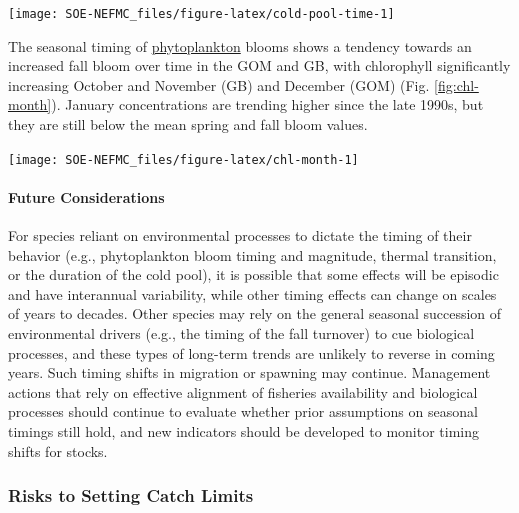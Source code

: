 \documentclass[
  10pt,
]{article}
\let\origfigure\figure
\let\endorigfigure\endfigure
\renewenvironment{figure}[1][2] {
    \expandafter\origfigure\expandafter[H]
} {
    \endorigfigure
}
\begin{document}
\begin{figure}

{\centering \texttt{[image: SOE-NEFMC\_files/figure-latex/cold-pool-time-1]} 

}

\caption{Cold pool persistence index based on bias-corrected ROMS-NWA (open circles) and GLORYS (closed circles).}\label{fig:cold-pool-time}
\end{figure}

The seasonal timing of \href{https://noaa-edab.github.io/catalog/chl_pp.html}{phytoplankton} blooms shows a tendency towards an increased fall bloom over time in the GOM and GB, with chlorophyll significantly increasing October and November (GB) and December (GOM) (Fig. \ref{fig:chl-month}). January concentrations are trending higher since the late 1990s, but they are still below the mean spring and fall bloom values.

\begin{figure}

{\centering \texttt{[image: SOE-NEFMC\_files/figure-latex/chl-month-1]} 

}

\end{figure}

\hypertarget{future-considerations-1}{%
\paragraph{Future Considerations}\label{future-considerations-1}}

For species reliant on environmental processes to dictate the timing of their behavior (e.g., phytoplankton bloom timing and magnitude, thermal transition, or the duration of the cold pool), it is possible that some effects will be episodic and have interannual variability, while other timing effects can change on scales of years to decades. Other species may rely on the general seasonal succession of environmental drivers (e.g., the timing of the fall turnover) to cue biological processes, and these types of long-term trends are unlikely to reverse in coming years. Such timing shifts in migration or spawning may continue. Management actions that rely on effective alignment of fisheries availability and biological processes should continue to evaluate whether prior assumptions on seasonal timings still hold, and new indicators should be developed to monitor timing shifts for stocks.

\hypertarget{risks-to-setting-catch-limits}{%
\subsubsection{Risks to Setting Catch Limits}\label{risks-to-setting-catch-limits}}
\end{document}
